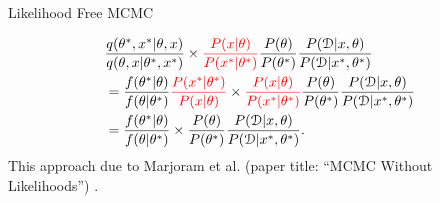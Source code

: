 \documentclass[12pt,a4paper,t,xcolor=dvipsnames,slidestop,compress,mathserif]{beamer}
\newcommand{\red}[1]{{\color{red}#1}}
\begin{document}
\begin{frame}{Likelihood Free MCMC}

\begin{align*}
&\frac{q(\theta^*, x^*|\theta, x)}{q(\theta, x|\theta^*, x^*)}
\times 
\red{\frac{P(x| \theta)}{P(x^*| \theta^*)}} 
\frac{ P( \theta)}{ P( \theta^*)} 
\frac{P(\mathcal{D}|x, \theta)}{P(\mathcal{D}|x^*, \theta^*)}\\
&=\frac{f(\theta^*|\theta)}{f(\theta|\theta^*)}
\red{\frac{P(x^*| \theta^*)}{P(x| \theta)} }
\times 
\red{\frac{P(x| \theta)}{P(x^*| \theta^*)} } 
\frac{ P( \theta)}{ P( \theta^*)}
\frac{P(\mathcal{D}|x, \theta)}{P(\mathcal{D}|x^*, \theta^*)}\\
&=\frac{f(\theta^*|\theta)}{f(\theta|\theta^*)}
\times 
\frac{ P( \theta)}{ P( \theta^*)} 
\frac{P(\mathcal{D}|x, \theta)}{P(\mathcal{D}|x^*, \theta^*)}.
\end{align*}
This approach due to Marjoram et al. (paper title: ``MCMC Without Likelihoods'') \cite{Marjoram23122003}. 
\end{frame}
\end{document}
